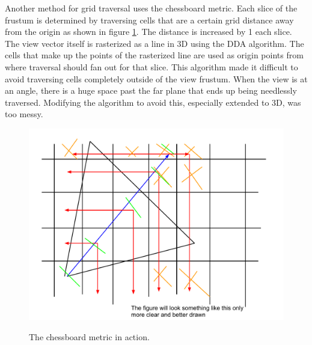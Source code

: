 \documentclass[12pt]{ucthesis}
\newcommand{\captionfonts}{\small\bf\ssp}
\begin{document}
Another method for grid traversal uses the chessboard metric.\cite{chess}
Each slice of the frustum is determined by traversing cells that are a certain grid distance away from the origin as shown in figure \ref{fig:chess-metric}.
The distance is increased by 1 each slice.
The view vector itself is rasterized as a line in 3D using the DDA algorithm.
The cells that make up the points of the rasterized line are used as origin points from where traversal should fan out for that slice.
This algorithm made it difficult to avoid traversing cells completely outside of the view frustum.
When the view is at an angle, there is a huge space past the far plane that ends up being needlessly traversed.
Modifying the algorithm to avoid this, especially extended to 3D, was too messy.

\begin{figure}
\begin{center}
\includegraphics[width=\textwidth]{Images/chess-metric.pdf}
\captionfonts
\caption[Chessboard Metric]{The chessboard metric in action.}
\label{fig:chess-metric}
\end{center}
\end{figure}
\end{document}
